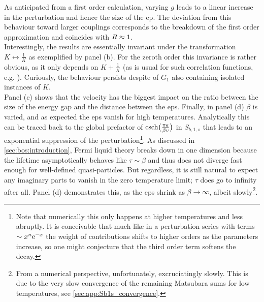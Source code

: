As anticipated from a first order calculation, varying $g$ leads to a linear increase in the perturbation and hence the size of the \gls{ep}.
The deviation from this behaviour toward larger couplings corresponds to the breakdown of the first order approximation and coincides with $R\approx 1$.\\
Interestingly, the results are essentially invariant under the transformation $K\leftrightarrow \frac{1}{K}$ as exemplified by panel (b).
For the zeroth order this invariance is rather obvious, as it only depends on $K+\frac{1}{K}$ (as is usual for such correlation functions, e.g. \cite[]{Giamarchi_2004}).
Curiously, the behaviour persists despite of $G_1$ also containing isolated instances of $K$.\\
Panel (c) shows that the velocity has the biggest impact on the ratio between the size of the energy gap and the distance between the \glspl{ep}.
Finally, in panel (d) $\beta$ is varied, and as expected the \glspl{ep} vanish for high temperatures.
Analytically this can be traced back to the global prefactor of $\csch\kla[\big]{\frac{\pi a}{\beta v}}$ in $S_{b,1,s}$ that leads to an exponential suppression of the perturbation\footnote{Note that numerically this only happens at higher temperatures and less abruptly. It is conceivable that much like in a perturbation series with terms $\sim x^n\text{e}^{-x}$ the weight of contributions shifts to higher orders as the parameters increase, so one might conjecture that the third order term softens the decay.}.
As discussed in \autoref{sec:bos:introduction}, Fermi liquid theory breaks down in one dimension because the lifetime asymptotically behaves like $\tau \sim \beta$ and thus does not diverge fast enough for well-defined quasi-particles.
But regardless, it is still natural to expect any imaginary parts to vanish in the zero temperature limit; $\tau$ does go to infinity after all.
Panel (d) demonstrates this, as the \glspl{ep} shrink as $\beta\rightarrow \infty$, albeit slowly\footnote{From a numerical perspective, unfortunately, excruciatingly slowly. This is due to the very slow convergence of the remaining Matsubara sums for low temperatures, see \autoref{sec:app:Sb1s_convergence}.}.
